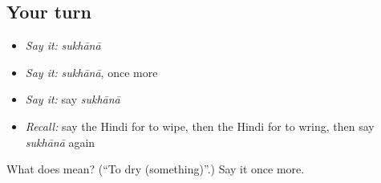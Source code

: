 \subsection*{Your turn}
\begin{itemize}
\raggedright
  \item \emph{Say it:} \emph{sukhānā}
  \item \emph{Say it:} \emph{sukhānā}, once more
  \item \emph{Say it:} say \emph{sukhānā}
  \item \emph{Recall:} say the Hindi for to wipe, then the Hindi for to wring, then say \emph{sukhānā} again
\end{itemize}

\begin{tcolorbox}[breakable,colback=teal!4,colframe=teal!35!black,title={Before you move on}]
What does  mean? (\textquotedblleft{}To dry (something)\textquotedblright{}.) Say it once more.
\end{tcolorbox}
